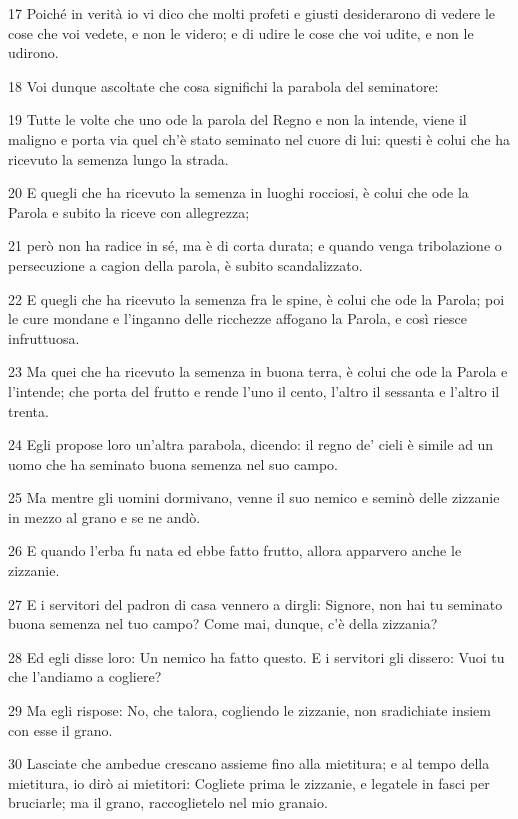 \par 17 Poiché in verità io vi dico che molti profeti e giusti desiderarono di vedere le cose che voi vedete, e non le videro; e di udire le cose che voi udite, e non le udirono.
\par 18 Voi dunque ascoltate che cosa significhi la parabola del seminatore:
\par 19 Tutte le volte che uno ode la parola del Regno e non la intende, viene il maligno e porta via quel ch'è stato seminato nel cuore di lui: questi è colui che ha ricevuto la semenza lungo la strada.
\par 20 E quegli che ha ricevuto la semenza in luoghi rocciosi, è colui che ode la Parola e subito la riceve con allegrezza;
\par 21 però non ha radice in sé, ma è di corta durata; e quando venga tribolazione o persecuzione a cagion della parola, è subito scandalizzato.
\par 22 E quegli che ha ricevuto la semenza fra le spine, è colui che ode la Parola; poi le cure mondane e l'inganno delle ricchezze affogano la Parola, e così riesce infruttuosa.
\par 23 Ma quei che ha ricevuto la semenza in buona terra, è colui che ode la Parola e l'intende; che porta del frutto e rende l'uno il cento, l'altro il sessanta e l'altro il trenta.
\par 24 Egli propose loro un'altra parabola, dicendo: il regno de' cieli è simile ad un uomo che ha seminato buona semenza nel suo campo.
\par 25 Ma mentre gli uomini dormivano, venne il suo nemico e seminò delle zizzanie in mezzo al grano e se ne andò.
\par 26 E quando l'erba fu nata ed ebbe fatto frutto, allora apparvero anche le zizzanie.
\par 27 E i servitori del padron di casa vennero a dirgli: Signore, non hai tu seminato buona semenza nel tuo campo? Come mai, dunque, c'è della zizzania?
\par 28 Ed egli disse loro: Un nemico ha fatto questo. E i servitori gli dissero: Vuoi tu che l'andiamo a cogliere?
\par 29 Ma egli rispose: No, che talora, cogliendo le zizzanie, non sradichiate insiem con esse il grano.
\par 30 Lasciate che ambedue crescano assieme fino alla mietitura; e al tempo della mietitura, io dirò ai mietitori: Cogliete prima le zizzanie, e legatele in fasci per bruciarle; ma il grano, raccoglietelo nel mio granaio.
